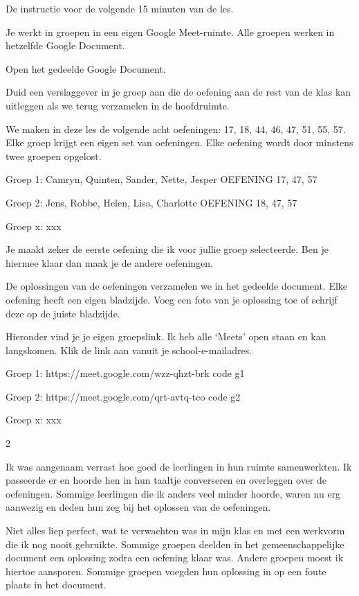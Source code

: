 De instructie voor de volgende 15 minuten van de les. 
\begin{nummering}
\item Je werkt in groepen in een eigen Google Meet-ruimte. Alle groepen werken in hetzelfde Google Document.
\item Open het gedeelde Google Document. 
\item Duid een verslaggever in je groep aan die de oefening aan de rest van de klas kan uitleggen als we terug verzamelen in de hoofdruimte.
\item We maken in deze les de volgende acht oefeningen: 17, 18, 44, 46, 47, 51, 55, 57. Elke groep krijgt een eigen set van oefeningen. Elke oefening wordt door minstens twee groepen opgelost.

\indent Groep 1: Camryn, Quinten, Sander, Nette, Jesper
OEFENING 17, 47, 57

\indent Groep 2: Jens, Robbe, Helen, Lisa, Charlotte		
OEFENING 18, 47, 57

\indent Groep x: xxx

\item Je maakt zeker de eerste oefening die ik voor jullie groep selecteerde. Ben je hiermee klaar dan maak je de andere oefeningen.
\item De oplossingen van de oefeningen verzamelen we in het gedeelde document. Elke oefening heeft een eigen bladzijde. Voeg een foto van je oplossing toe of schrijf deze op de juiste bladzijde. 
\item Hieronder vind je je eigen groepslink. Ik heb alle ‘Meets’ open staan en kan langskomen. Klik de link aan vanuit je school-e-mailadres.

\indent Groep 1: https://meet.google.com/wzz-qhzt-brk code g1

\indent Groep 2: https://meet.google.com/qrt-avtq-tco code g2

\indent Groep x: xxx

\end{nummering}
\eindewerktekst
\begin{multicols} {2}

Ik was aangenaam verrast hoe goed de leerlingen in hun ruimte samenwerkten. Ik passeerde er en hoorde hen in hun taaltje converseren en overleggen over de oefeningen. Sommige leerlingen die ik anders veel minder hoorde, waren nu erg aanwezig en deden hun zeg bij het oplossen van de oefeningen. 

Niet alles liep perfect, wat te verwachten was in mijn klas en met een werkvorm die ik nog nooit gebruikte. Sommige groepen deelden in het gemeenschappelijke document een oplossing zodra een oefening klaar was. Andere groepen moest ik hiertoe aansporen. Sommige groepen voegden hun oplossing in op een foute plaats in het document. 

\end{multicols}


